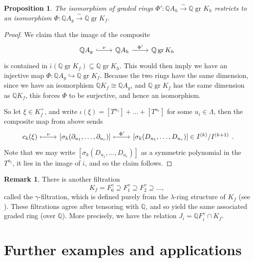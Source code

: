 \documentclass[oneside]{amsart}
\theoremstyle{plain}
\newtheorem{proposition}[theorem]{Proposition}
\theoremstyle{definition}
\newtheorem{remark}[theorem]{Remark}
\newcommand{\Q}{{\mathbb{Q}}}
\newcommand{\gr}{\operatorname{gr}}
\begin{document}
\begin{proposition}
    The isomorphism of graded rings $\Phi': \Q A_{h} \xrightarrow{\sim} \Q \gr K_{h}$
    restricts to an isomorphism $\Phi: \Q A_g \xrightarrow{\sim} \Q \gr K_f$.
\end{proposition}

\begin{proof}
    We claim that the image of the composite
    \[
    \begin{tikzcd}
        \Q A_g \arrow[r, "\nu", hook] & \Q A_{h} \arrow[r, "\Phi'"] & \Q \gr K_{h}
    \end{tikzcd}
    \]
    is contained in $\bar\iota(\Q \gr K_f) \subseteq \Q \gr K_{h}$. This would
    then imply we have an injective map $\Phi: \Q A_g \hookrightarrow \Q \gr K_{f}$.
    Because the two rings have the same dimension, since we have an isomorphism $\Q K_f \cong \Q A_g$, and $\Q \gr K_f$ has the same dimension as $\Q K_f$, this forces $\Phi$ to be surjective, and hence an isomorphism.

    So let $\xi \in K_f^+$, and write $\iota(\xi) = [T^{u_1}] + \dots + [T^{u_r}]$ for some $u_i \in \Lambda$,
    then the composite map from above sends
    \[
    \begin{tikzcd}
        c_k(\xi) \arrow[r, "\nu", maps to] & \left[\sigma_k(\partial_{u_1}, \dots, \partial_{u_r})\right] \arrow[r, "\Phi'", maps to] & \left[\sigma_k(D_{u_1}, \dots, D_{u_r})\right] \in I^{(k)}/I^{(k+1)}
    \end{tikzcd}.
    \]
    Note that we may write $[\sigma_k(D_{u_1}, \dots, D_{u_r})]$ as a symmetric polynomial in the $T^{u_i}$, it lies in the image of $\bar\iota$, and so the claim follows.
\end{proof}

\begin{remark}
    There is another filtration
    \[
    K_f = F_0^\gamma \supseteq F_1^\gamma \supseteq F_2^\gamma \supseteq \dots,
    \]
    called the $\gamma$-filtration, which is defined purely from the $\lambda$-ring structure of $K_f$ (see \cite[Chapter III]{FultonLang85}). These filtrations agree after tensoring with $\Q$, and so yield the same associated graded ring (over $\Q$).
    More precisely, we have the relation $J_i = \Q F_i^\gamma \cap K_f$.
\end{remark}

\section{Further examples and applications}\label{sec:examples}
\end{document}
